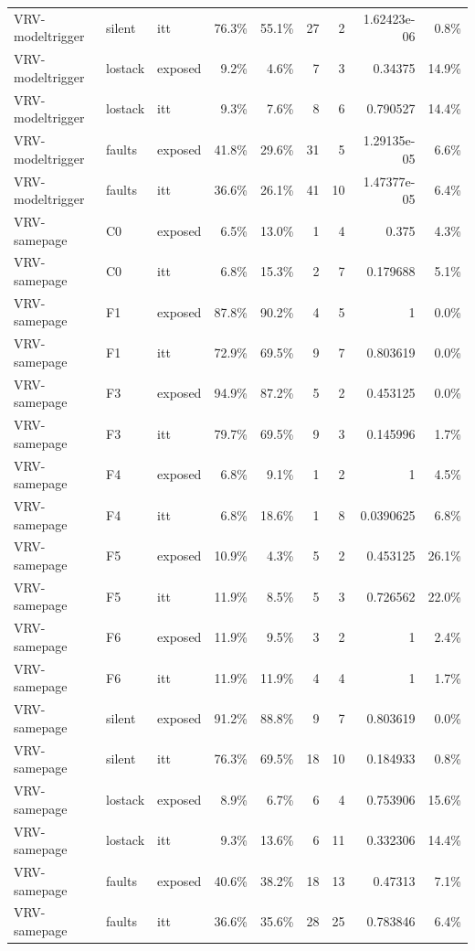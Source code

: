 \begin{tabular}{lllrrrrrr}
VRV-modeltrigger & silent & itt & 76.3\% & 55.1\% & 27 & 2 & 1.62423e-06 & 0.8\% \\
VRV-modeltrigger & lostack & exposed & 9.2\% & 4.6\% & 7 & 3 & 0.34375 & 14.9\% \\
VRV-modeltrigger & lostack & itt & 9.3\% & 7.6\% & 8 & 6 & 0.790527 & 14.4\% \\
VRV-modeltrigger & faults & exposed & 41.8\% & 29.6\% & 31 & 5 & 1.29135e-05 & 6.6\% \\
VRV-modeltrigger & faults & itt & 36.6\% & 26.1\% & 41 & 10 & 1.47377e-05 & 6.4\% \\
VRV-samepage & C0 & exposed & 6.5\% & 13.0\% & 1 & 4 & 0.375 & 4.3\% \\
VRV-samepage & C0 & itt & 6.8\% & 15.3\% & 2 & 7 & 0.179688 & 5.1\% \\
VRV-samepage & F1 & exposed & 87.8\% & 90.2\% & 4 & 5 & 1 & 0.0\% \\
VRV-samepage & F1 & itt & 72.9\% & 69.5\% & 9 & 7 & 0.803619 & 0.0\% \\
VRV-samepage & F3 & exposed & 94.9\% & 87.2\% & 5 & 2 & 0.453125 & 0.0\% \\
VRV-samepage & F3 & itt & 79.7\% & 69.5\% & 9 & 3 & 0.145996 & 1.7\% \\
VRV-samepage & F4 & exposed & 6.8\% & 9.1\% & 1 & 2 & 1 & 4.5\% \\
VRV-samepage & F4 & itt & 6.8\% & 18.6\% & 1 & 8 & 0.0390625 & 6.8\% \\
VRV-samepage & F5 & exposed & 10.9\% & 4.3\% & 5 & 2 & 0.453125 & 26.1\% \\
VRV-samepage & F5 & itt & 11.9\% & 8.5\% & 5 & 3 & 0.726562 & 22.0\% \\
VRV-samepage & F6 & exposed & 11.9\% & 9.5\% & 3 & 2 & 1 & 2.4\% \\
VRV-samepage & F6 & itt & 11.9\% & 11.9\% & 4 & 4 & 1 & 1.7\% \\
VRV-samepage & silent & exposed & 91.2\% & 88.8\% & 9 & 7 & 0.803619 & 0.0\% \\
VRV-samepage & silent & itt & 76.3\% & 69.5\% & 18 & 10 & 0.184933 & 0.8\% \\
VRV-samepage & lostack & exposed & 8.9\% & 6.7\% & 6 & 4 & 0.753906 & 15.6\% \\
VRV-samepage & lostack & itt & 9.3\% & 13.6\% & 6 & 11 & 0.332306 & 14.4\% \\
VRV-samepage & faults & exposed & 40.6\% & 38.2\% & 18 & 13 & 0.47313 & 7.1\% \\
VRV-samepage & faults & itt & 36.6\% & 35.6\% & 28 & 25 & 0.783846 & 6.4\% \\

\end{tabular}
